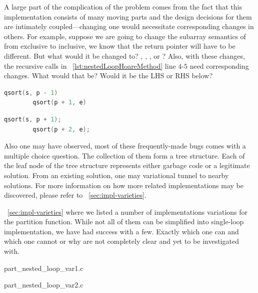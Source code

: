 A large part of the complication of the problem comes from the fact that this implementation
consists of many moving parts and the design decisions for them are intimately
coupled---changing one would necessitate corresponding changes in others.
For example, suppose we are going to change the subarray semantics of  from exclusive to
inclusive, we know that the return pointer will have to be different.
But what would it be changed to?
, , , or ?
Also, with these changes, the recursive calls in ~\autoref{lst:nestedLoopHoareMethod} line
$4$-$5$ need corresponding changes.
What would that be?
Would it be the LHS or RHS below?

\begin{minipage}[t]{.4\textwidth}
    \begin{lstlisting}[language=C]
        qsort(s, p - 1)
        qsort(p + 1, e)
    \end{lstlisting}
\end{minipage}\hfill
\begin{minipage}[t]{.4\textwidth}
    \begin{lstlisting}[language=C]
        qsort(s, p + 1);
        qsort(p + 2, e);
    \end{lstlisting}
\end{minipage}


Also one may have observed, most of these frequently-made bugs comes with a multiple choice
question.
The collection of them form a tree structure.
Each of the leaf node of the tree structure represents either garbage code or a legitimate
solution.
From an existing solution, one may variational tunnel to nearby solutions.
For more information on how more related implementations may be discovered, please refer to
~\autoref{sec:impl-varieties}.

~\autoref{sec:impl-varieties} where we listed a number of implementations variations
for the partition function.
While not all of them can be simplified into single-loop implementation, we have had success with
a few.
Exactly which one can and which one cannot or why are not completely clear and yet to be
investigated with.



{part_nested_loop_var1.c}


{part_nested_loop_var2.c}

